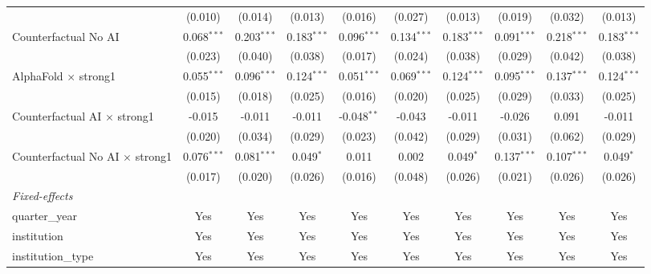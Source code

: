 \begin{tabular}{lccccccccc}
                                          & (0.010)       & (0.014)       & (0.013)       & (0.016)       & (0.027)       & (0.013)       & (0.019)       & (0.032)       & (0.013)\\   
   Counterfactual No AI                   & 0.068$^{***}$ & 0.203$^{***}$ & 0.183$^{***}$ & 0.096$^{***}$ & 0.134$^{***}$ & 0.183$^{***}$ & 0.091$^{***}$ & 0.218$^{***}$ & 0.183$^{***}$\\   
                                          & (0.023)       & (0.040)       & (0.038)       & (0.017)       & (0.024)       & (0.038)       & (0.029)       & (0.042)       & (0.038)\\   
   AlphaFold $\times$ strong1             & 0.055$^{***}$ & 0.096$^{***}$ & 0.124$^{***}$ & 0.051$^{***}$ & 0.069$^{***}$ & 0.124$^{***}$ & 0.095$^{***}$ & 0.137$^{***}$ & 0.124$^{***}$\\   
                                          & (0.015)       & (0.018)       & (0.025)       & (0.016)       & (0.020)       & (0.025)       & (0.029)       & (0.033)       & (0.025)\\   
   Counterfactual AI $\times$ strong1     & -0.015        & -0.011        & -0.011        & -0.048$^{**}$ & -0.043        & -0.011        & -0.026        & 0.091         & -0.011\\   
                                          & (0.020)       & (0.034)       & (0.029)       & (0.023)       & (0.042)       & (0.029)       & (0.031)       & (0.062)       & (0.029)\\   
   Counterfactual No AI $\times$ strong1  & 0.076$^{***}$ & 0.081$^{***}$ & 0.049$^{*}$   & 0.011         & 0.002         & 0.049$^{*}$   & 0.137$^{***}$ & 0.107$^{***}$ & 0.049$^{*}$\\   
                                          & (0.017)       & (0.020)       & (0.026)       & (0.016)       & (0.048)       & (0.026)       & (0.021)       & (0.026)       & (0.026)\\   
   \midrule
   \emph{Fixed-effects}\\
   quarter\_year                          & Yes           & Yes           & Yes           & Yes           & Yes           & Yes           & Yes           & Yes           & Yes\\  
   institution                            & Yes           & Yes           & Yes           & Yes           & Yes           & Yes           & Yes           & Yes           & Yes\\  
   institution\_type                      & Yes           & Yes           & Yes           & Yes           & Yes           & Yes           & Yes           & Yes           & Yes\\  

\end{tabular}
